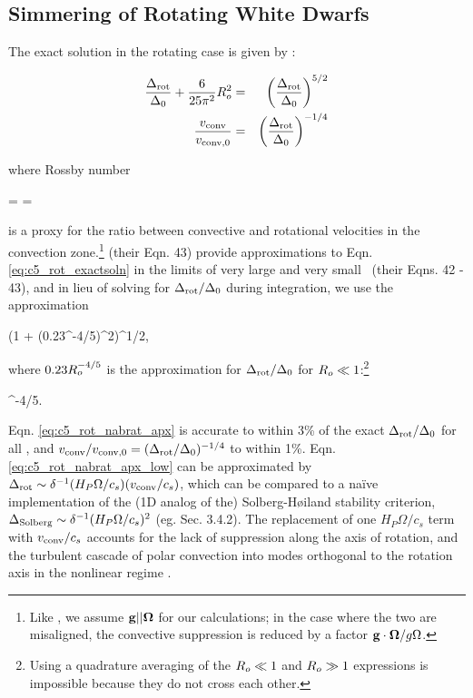 \subsection{Simmering of Rotating White Dwarfs}
\label{ssec:c5_runaway_rot}

The exact solution in the rotating case is given by \citeal{stev79}:

\begin{eqnarray}
\frac{\dnabrot}{\dnabconvzero} + \frac{6}{25\pi^2}\rossby^2 &=& \left(\frac{\dnabrot}{\dnabconvzero}\right)^{5/2} \nonumber \\
\frac{\vconv}{\vconvzero} &=& \left(\frac{\dnabrot}{\dnabconvzero}\right)^{-1/4}
\label{eq:c5_rot_exactsoln}
\end{eqnarray}

\noindent where Rossby number

\eqbegin
\rossby =  = 
\label{eq:c5_rossbynumber}
\eqend

\noindent is a proxy for the ratio between convective and rotational velocities in the convection zone.\footnote{Like \cite{barkdl14}, we assume ${\bf g}||\boldsymbol{\Omega}$ for our calculations; in the case where the two are misaligned, the convective suppression is reduced by a factor ${\bf g}\cdot \boldsymbol{\Omega}/g\Omega$.}  \citeal{stev79} (their Eqn. 43) provide approximations to Eqn. \ref{eq:c5_rot_exactsoln} in the limits of very large and very small \rossby\ (their Eqns. 42 - 43), and in lieu of solving for $\dnabrot/\dnabconvzero$ during integration, we use the approximation

\eqbegin
\frac{\dnabrot}{\dnabconvzero} \approx \left(1 + \left(0.23\rossby^{-4/5}\right)^2\right)^{1/2},
\label{eq:c5_rot_nabrat_apx}
\eqend

\noindent where $0.23\rossby^{-4/5}$ is the \citeal{stev79} approximation for $\dnabrot/\dnabconvzero$ for $\rossby \ll 1$:\footnote{Using a quadrature averaging of the \citeal{stev79} $\rossby \ll 1$ and $\rossby \gg 1$ expressions is impossible because they do not cross each other.}

\eqbegin
\frac{\dnabrot}{\dnabconvzero}  \rossby^{-4/5}.
\label{eq:c5_rot_nabrat_apx_low}
\eqend

\noindent Eqn. \ref{eq:c5_rot_nabrat_apx} is accurate to within 3\% of the exact $\dnabrot/\dnabconvzero$ for all \rossby, and $\vconv/\vconvzero = (\dnabrot/\dnabconvzero)^{-1/4}$ to within 1\%.  Eqn. \ref{eq:c5_rot_nabrat_apx_low} can be approximated by $\dnabrot \sim \delta^{-1}(H_P\Omega/c_s)(\vconv/c_s)$, which can be compared to a na\"{i}ve implementation of the (1D analog of the) Solberg-H{\o}iland stability criterion, $\Delta_\mathrm{Solberg} \sim \delta^{-1}(H_P\Omega/c_s)^2$ (eg. \citealt{tass00} Sec. 3.4.2).  The replacement of one $H_P\Omega/c_s$ term with $\vconv/c_s$ accounts for the lack of suppression along the axis of rotation, and the turbulent cascade of polar convection into modes orthogonal to the rotation axis in the nonlinear regime \citep{barkdl14}.

